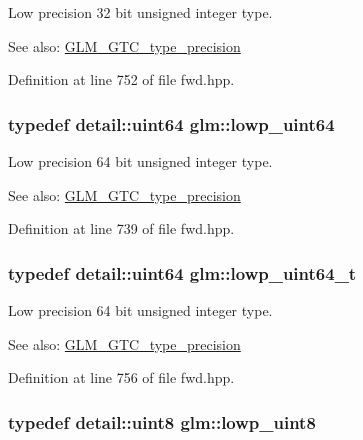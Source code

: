 Low precision 32 bit unsigned integer type. \begin{Desc}
\item[See also:]\hyperlink{group__gtc__type__precision}{GLM\_\-GTC\_\-type\_\-precision} \end{Desc}


Definition at line 752 of file fwd.hpp.\hypertarget{group__gtc__type__precision_gcf666a9d9b309c4615c7a4f2ab0be289}{
\subsubsection[lowp\_\-uint64]{\setlength{\rightskip}{0pt plus 5cm}typedef detail::uint64 {\bf glm::lowp\_\-uint64}}}
\label{group__gtc__type__precision_gcf666a9d9b309c4615c7a4f2ab0be289}


Low precision 64 bit unsigned integer type. \begin{Desc}
\item[See also:]\hyperlink{group__gtc__type__precision}{GLM\_\-GTC\_\-type\_\-precision} \end{Desc}


Definition at line 739 of file fwd.hpp.\hypertarget{group__gtc__type__precision_gbf3069d4f188557a87b1d7f35eb0a270}{
\subsubsection[lowp\_\-uint64\_\-t]{\setlength{\rightskip}{0pt plus 5cm}typedef detail::uint64 {\bf glm::lowp\_\-uint64\_\-t}}}
\label{group__gtc__type__precision_gbf3069d4f188557a87b1d7f35eb0a270}


Low precision 64 bit unsigned integer type. \begin{Desc}
\item[See also:]\hyperlink{group__gtc__type__precision}{GLM\_\-GTC\_\-type\_\-precision} \end{Desc}


Definition at line 756 of file fwd.hpp.\hypertarget{group__gtc__type__precision_g4d9dc08b7b248a386dfe9afd00fc6b1e}{
\subsubsection[lowp\_\-uint8]{\setlength{\rightskip}{0pt plus 5cm}typedef detail::uint8 {\bf glm::lowp\_\-uint8}}}
\label{group__gtc__type__precision_g4d9dc08b7b248a386dfe9afd00fc6b1e}


